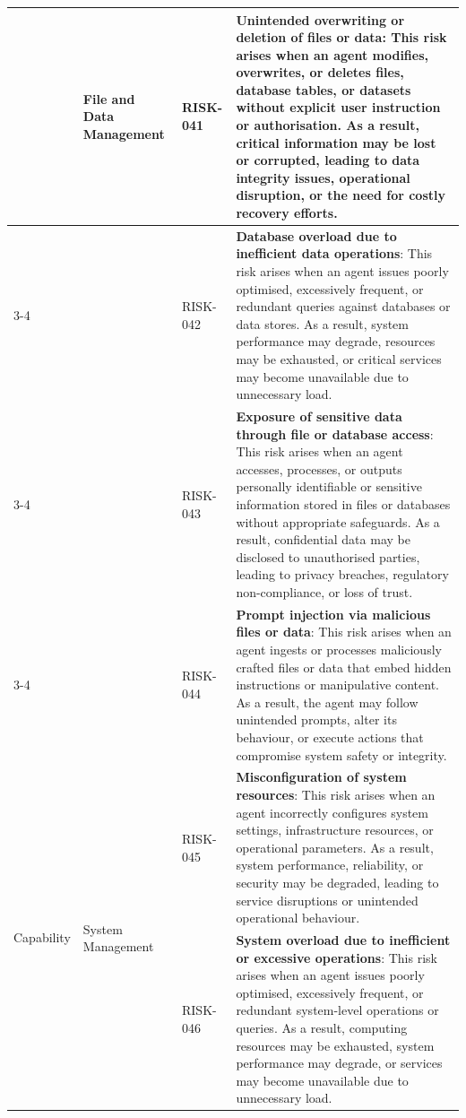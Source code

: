 \documentclass{article}
\begin{document}
\begin{longtable}{|p{}|p{}|p{}|p{}|}
\pagebreak
\multirow{4}{=}{Capability}
& \multirow{4}{=}{File and Data Management}
& RISK-041 & \textbf{Unintended overwriting or deletion of files or data}: This risk arises when an agent modifies, overwrites, or deletes files, database tables, or datasets without explicit user instruction or authorisation. As a result, critical information may be lost or corrupted, leading to data integrity issues, operational disruption, or the need for costly recovery efforts. \\ \cline{3-4}
& & RISK-042 & \textbf{Database overload due to inefficient data operations}: This risk arises when an agent issues poorly optimised, excessively frequent, or redundant queries against databases or data stores. As a result, system performance may degrade, resources may be exhausted, or critical services may become unavailable due to unnecessary load. \\ \cline{3-4}
& & RISK-043 & \textbf{Exposure of sensitive data through file or database access}: This risk arises when an agent accesses, processes, or outputs personally identifiable or sensitive information stored in files or databases without appropriate safeguards. As a result, confidential data may be disclosed to unauthorised parties, leading to privacy breaches, regulatory non-compliance, or loss of trust. \\ \cline{3-4}
& & RISK-044 & \textbf{Prompt injection via malicious files or data}: This risk arises when an agent ingests or processes maliciously crafted files or data that embed hidden instructions or manipulative content. As a result, the agent may follow unintended prompts, alter its behaviour, or execute actions that compromise system safety or integrity. \\ \hline
\multirow{2}{=}{Capability}
& \multirow{2}{=}{System Management}
& RISK-045 & \textbf{Misconfiguration of system resources}: This risk arises when an agent incorrectly configures system settings, infrastructure resources, or operational parameters. As a result, system performance, reliability, or security may be degraded, leading to service disruptions or unintended operational behaviour. \\ \cline{3-4}
& & RISK-046 & \textbf{System overload due to inefficient or excessive operations}: This risk arises when an agent issues poorly optimised, excessively frequent, or redundant system-level operations or queries. As a result, computing resources may be exhausted, system performance may degrade, or services may become unavailable due to unnecessary load. \\ \hline
\end{longtable}
\end{document}
